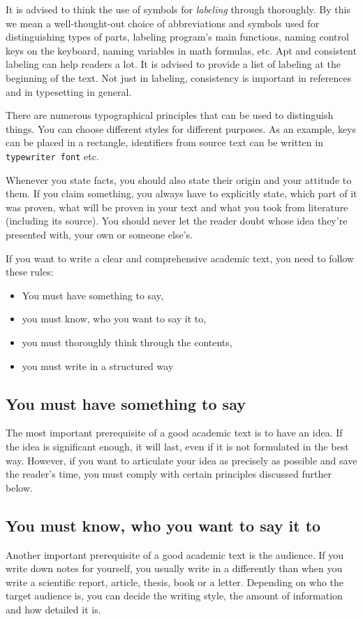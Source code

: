 It is advised to think the use of symbols for {\it labeling} through thoroughly. By this we mean a well-thought-out choice of abbreviations and symbols used for distinguishing types of parts, labeling program's main functions, naming control keys on the keyboard, naming variables in math formulas, etc. Apt and consistent labeling can help readers a lot. It is advised to provide a list of labeling at the beginning of the text. Not just in labeling, consistency is important in references and in typesetting in general.

There are numerous typographical principles that can be used to distinguish things. You can choose different styles for different purposes. As an example, keys can be placed in a rectangle, identifiers from source text can be written in {\tt typewriter font} etc.

Whenever you state facts, you should also state their origin and your attitude to them. If you claim something, you always have to explicitly state, which part of it was proven, what will be proven in your text and what you took from literature (including its source). You should never let the reader doubt whose idea they're presented with, your own or someone else's.


If you want to write a clear and comprehensive academic text, you need to follow these rules:
\begin{itemize}
\item You must have something to say,
\item you must know, who you want to say it to,
\item you must thoroughly think through the contents,
\item you must write in a structured way 
\end{itemize}

\subsection*{You must have something to say}
The most important prerequisite of a good academic text is to have an idea. If the idea is significant enough, it will last, even if it is not formulated in the best way. However, if you want to articulate your idea as precisely as possible and save the reader's time, you must comply with certain principles discussed further below.

\subsection*{You must know, who you want to say it to}
Another important prerequisite of a good academic text is the audience. If you write down notes for yourself, you usually write in a differently than when you write a scientific report, article, thesis, book or a letter. Depending on who the target audience is, you can decide the writing style, the amount of information and how detailed it is. 

